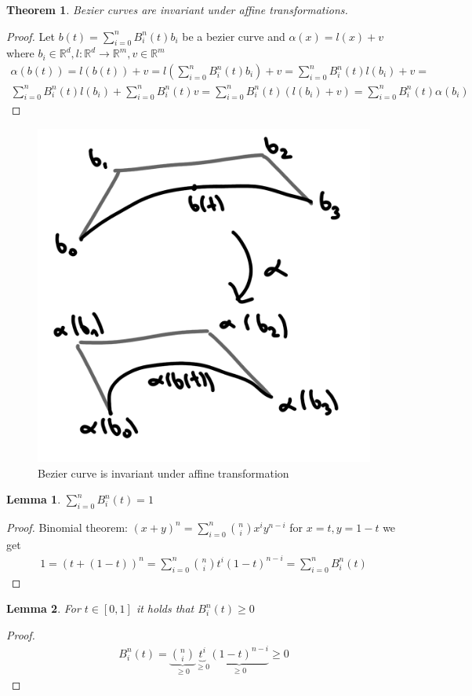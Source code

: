\documentclass[]{article}
\newtheorem{lemma}{Lemma}
\newtheorem{theorem}{Theorem}
\begin{document}
\begin{theorem}
	Bezier curves are invariant under affine transformations. 
\end{theorem}

\begin{proof}
	Let $b(t) = \sum_{i=0}^{n} B_i^n(t) b_i$ be a bezier curve and $\alpha(x) = l(x) + v$ where $b_i\in\mathbb{R}^d, l:\mathbb{R}^d\rightarrow\mathbb{R}^m, v \in \mathbb{R}^m$
	\begin{align*}
		\alpha(b(t)) = l(b(t)) + v = l\left(\sum_{i=0}^{n} B_i^n(t) b_i\right) + v = \sum_{i=0}^{n} B_i^n(t) l(b_i) + v =\\
		\sum_{i=0}^{n}B_i^n(t) l(b_i) + \sum_{i=0}^{n}B_i^n(t)v = \sum_{i=0}^{n}B_i^n(t)(l(b_i) + v) = \sum_{i=0}^{n} B_i^n(t) \alpha(b_i)
	\end{align*}
\end{proof}

\begin{figure}[h!]
	\centering
	\includegraphics[width=0.3\linewidth]{figures/affine_transformation_bezier}
	\caption{Bezier curve is invariant under affine transformation}
	\label{fig:affine_transformation_bezier}
\end{figure}

\begin{lemma}
	$\sum_{i=0}^{n}B_i^n(t) = 1$
\end{lemma}

\begin{proof}
	Binomial theorem: $(x+y)^n = \sum_{i=0}^{n} \binom{n}{i} x^i y^{n-i}$ for $x=t, y=1-t$ we get
	\begin{align*}
		1 = (t+(1-t))^n = \sum_{i=0}^{n} \binom{n}{i} t^i (1-t)^{n-i} = \sum_{i=0}^{n} B_i^n(t)
	\end{align*}
\end{proof}

\begin{lemma}
	For $t\in[0,1]$ it holds that $B_i^n(t) \geq 0$
\end{lemma}

\begin{proof}
	\begin{align*}
		B_i^n(t) = \underbrace{\binom{n}{i}}_{\geq 0} \underbrace{t^i}_{\geq 0} \underbrace{(1-t)^{n-i}}_{\geq 0} \geq 0
	\end{align*}
\end{proof}
\end{document}
